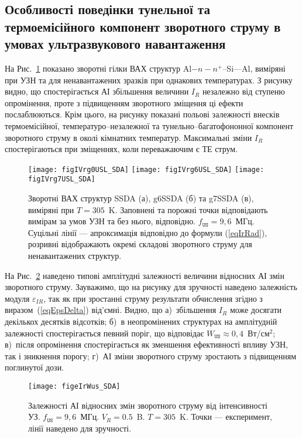 \subsection{Особливості поведінки тунельної та термоемісійного компонент зворотного струму в умовах ультразвукового навантаження}

На Рис.~\ref{figIVrg0USL_SDA} показано зворотні гілки ВАХ структур Al$-n-n^+$--Si---Al, виміряні при УЗН та для ненавантажених
зразків при однакових температурах.
З рисунку видно, що спостерігається АІ збільшення величини $I_R$ незалежно від ступеню опромінення, проте з підвищенням зворотного
зміщення ці ефекти послаблюються.
Крім цього, на рисунку показані польові залежності внесків термоемісійної, температуро--незалежної та тунельно--багатофононної компонент
зворотного струму в околі кімнатних температур.
Максимальні зміни $I_R$ спостерігаються при зміщеннях, коли переважаючим є ТЕ струм.


\begin{figure}
\center
\texttt{[image: figIVrg0USL\_SDA]}
\texttt{[image: figIVrg6USL\_SDA]}
\texttt{[image: figIVrg7USL\_SDA]}
\caption{\label{figIVrg0USL_SDA}
Зворотні  ВАХ  структур SSDA (а), g6SSDA (б) та g7SSDA (в), виміряні при $T=305$~K.
Заповнені та порожні точки відповідають вимірам за умов УЗН та без нього, відповідно.
$f_\mathtt{US}=9,6$~МГц.
Суцільні лінії --- апроксимація відповідно до формули (\ref{eqIrRad}),
розривні відображають окремі складові зворотного струму для ненавантажених структур.
}%
\end{figure}



На Рис.~\ref{figeIrWus_SDA} наведено типові амплітудні залежності величини відносних АІ змін зворотного струму.
Зауважимо, що на рисунку для зручності наведено залежність модуля $\varepsilon_{IR}$, так як при зростанні струму результати обчислення згідно з виразом~(\ref{eqEpsDelta}) від'ємні.
Видно, що
а)~збільшення $I_R$ може досягати декількох десятків відсотків;
б)~в неопромінених структурах на амплітудній залежності спостерігається певний поріг, що відповідає $W_\mathtt{US}\approx0,4$~Вт/см$^2$;
в)~після опромінення спостерігається як зменшення ефективності впливу УЗН, так і зникнення порогу;
г)~АІ зміни зворотного струму зростають з підвищенням поглинутої дози.


\begin{figure}
\center
\texttt{[image: figeIrWus\_SDA]}
\caption{\label{figeIrWus_SDA}
Залежності АІ відносних змін зворотного струму від інтенсивності УЗ.
$f_\mathtt{US}=9,6$~МГц.
$V_R=0.5$~B. $T=305$~K.
Точки --- експеримент,
лінії наведено для зручності.
}%
\end{figure}

